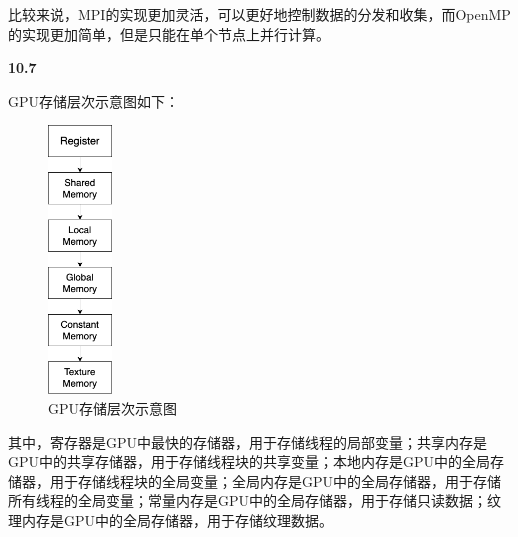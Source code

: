 \documentclass[UTF8]{report}
\begin{document}
比较来说，MPI的实现更加灵活，可以更好地控制数据的分发和收集，而OpenMP的实现更加简单，但是只能在单个节点上并行计算。

\noindent
\textbf{10.7}

GPU存储层次示意图如下：

\begin{figure}[H]
    \centering
    \includegraphics[width=0.15\textwidth]{10_7.png}
    \caption{GPU存储层次示意图}
\end{figure}

其中，寄存器是GPU中最快的存储器，用于存储线程的局部变量；共享内存是GPU中的共享存储器，用于存储线程块的共享变量；本地内存是GPU中的全局存储器，用于存储线程块的全局变量；全局内存是GPU中的全局存储器，用于存储所有线程的全局变量；常量内存是GPU中的全局存储器，用于存储只读数据；纹理内存是GPU中的全局存储器，用于存储纹理数据。
\end{document}
